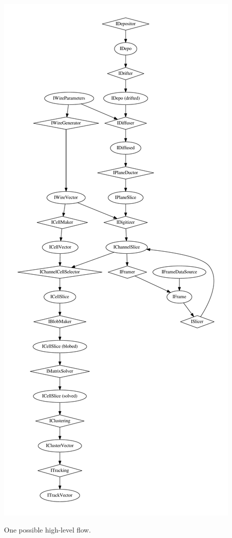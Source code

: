 \begin{frame}[fragile]
\begin{columns}
\begin{column}{0.3\textwidth}
        \includegraphics[width=\textwidth]{dataflow.pdf}

        \tiny One possible high-level flow.
      \end{column}
    \end{columns}
\end{frame}

